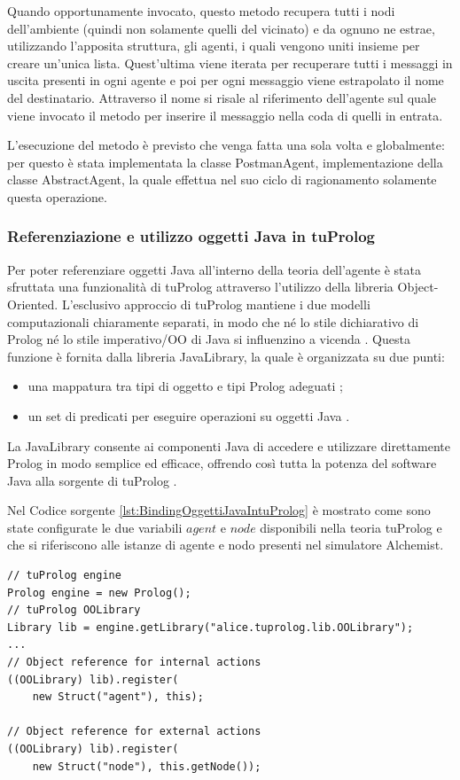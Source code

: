 Quando opportunamente invocato, questo metodo recupera tutti i nodi dell'ambiente (quindi non solamente quelli del vicinato) e da ognuno ne estrae, utilizzando l'apposita struttura, gli agenti, i quali vengono uniti insieme per creare un'unica lista. Quest'ultima viene iterata per recuperare tutti i messaggi in uscita presenti in ogni agente e poi per ogni messaggio viene estrapolato il nome del destinatario. Attraverso il nome si risale al riferimento dell'agente sul quale viene invocato il metodo per inserire il messaggio nella coda di quelli in entrata.

L'esecuzione del metodo è previsto che venga fatta una sola volta e globalmente: per questo è stata implementata la classe PostmanAgent, implementazione della classe AbstractAgent, la quale effettua nel suo ciclo di ragionamento solamente questa operazione.

\subsubsection{Referenziazione e utilizzo oggetti Java in tuProlog}
Per poter referenziare oggetti Java all'interno della teoria dell'agente è stata sfruttata una funzionalità di tuProlog attraverso l'utilizzo della libreria Object-Oriented.
L'esclusivo approccio di tuProlog mantiene i due modelli computazionali chiaramente separati, in modo che né lo stile dichiarativo di Prolog né lo stile imperativo/OO di Java si influenzino a vicenda \cite{2p-alpnews2013}.
Questa funzione è fornita dalla libreria JavaLibrary, la quale è organizzata su due punti:
\begin{itemize}
   \item una mappatura tra tipi di oggetto e tipi Prolog adeguati \cite{2p-alpnews2013};
   \item un set di predicati per eseguire operazioni su oggetti Java \cite{2p-alpnews2013}.
\end{itemize}
La JavaLibrary consente ai componenti Java di accedere e utilizzare direttamente Prolog in modo semplice ed efficace, offrendo così tutta la potenza del software Java alla sorgente di tuProlog \cite{tuPrologLight-weight}.

Nel Codice sorgente \ref{lst:BindingOggettiJavaIntuProlog} è mostrato come sono state configurate le due variabili $agent$ e $node$ disponibili nella teoria tuProlog e che si riferiscono alle istanze di agente e nodo presenti nel simulatore Alchemist.

\switchToJava{}{}
\begin{lstlisting}[float,firstnumber=1,label={lst:BindingOggettiJavaIntuProlog},caption={Binding oggetti Java in tuProlog}]
// tuProlog engine
Prolog engine = new Prolog();
// tuProlog OOLibrary
Library lib = engine.getLibrary("alice.tuprolog.lib.OOLibrary");
...
// Object reference for internal actions
((OOLibrary) lib).register(
	new Struct("agent"), this);

// Object reference for external actions
((OOLibrary) lib).register(
	new Struct("node"), this.getNode());
\end{lstlisting}

